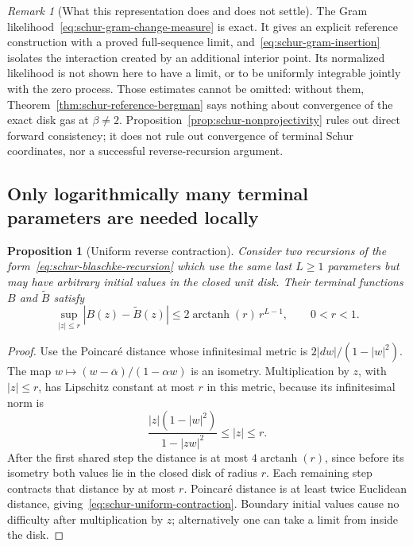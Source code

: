 \documentclass[11pt,a4paper]{article}
\numberwithin{equation}{section}
\newtheorem{proposition}[theorem]{Proposition}
\theoremstyle{definition}
\theoremstyle{remark}
\newtheorem{remark}[theorem]{Remark}
\begin{document}
\begin{remark}[What this representation does and does not settle]
The Gram likelihood~\eqref{eq:schur-gram-change-measure} is exact.
It gives an explicit reference construction with a proved full-sequence
limit, and~\eqref{eq:schur-gram-insertion} isolates the interaction
created by an additional interior point. Its normalized likelihood
is not shown here to have a limit, or to be uniformly integrable
jointly with the zero process. Those estimates cannot be omitted:
without them, Theorem~\ref{thm:schur-reference-bergman} says nothing
about convergence of the exact disk gas at $\beta\ne2$.
Proposition~\ref{prop:schur-nonprojectivity} rules out direct forward
consistency; it does not rule out convergence of terminal Schur
coordinates, nor a successful reverse-recursion argument.
\end{remark}

\subsection{Only logarithmically many terminal parameters are needed locally}

\begin{proposition}[Uniform reverse contraction]
\label{prop:schur-reverse-contraction}
Consider two recursions of the form~\eqref{eq:schur-blaschke-recursion}
which use the same last $L\ge1$ parameters but may have arbitrary
initial values in the closed unit disk. Their terminal functions
$B$ and $\widetilde B$ satisfy
\begin{equation}
 \sup_{|z|\le r}|B(z)-\widetilde B(z)|
 \le2\operatorname{arctanh}(r)\,r^{L-1},\qquad 0<r<1.
 \label{eq:schur-uniform-contraction}
\end{equation}
\end{proposition}

\begin{proof}
Use the Poincar\'e distance whose infinitesimal metric is
$2|dw|/(1-|w|^2)$. The map
$w\mapsto(w-\overline\alpha)/(1-\alpha w)$ is an isometry.
Multiplication by $z$, with $|z|\le r$, has Lipschitz constant at
most $r$ in this metric, because its infinitesimal norm is
\[
 \frac{|z|(1-|w|^2)}{1-|zw|^2}\le |z|\le r.
\]
After the first shared step the distance is at most
$4\operatorname{arctanh}(r)$, since before its isometry both values
lie in the closed disk of radius $r$. Each remaining step contracts
that distance by at most $r$. Poincar\'e distance is at least twice
Euclidean distance, giving~\eqref{eq:schur-uniform-contraction}.
Boundary initial values cause no difficulty after multiplication
by $z$; alternatively one can take a limit from inside the disk.
\end{proof}
\end{document}
